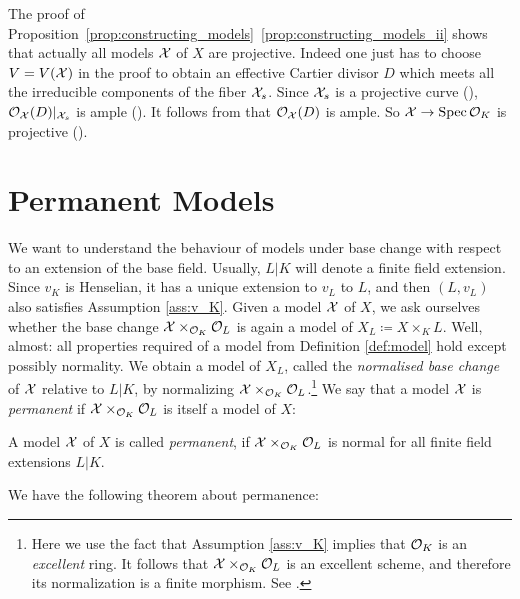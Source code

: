 \begin{remark}
    The proof of Proposition~\ref{prop:constructing_models}~\ref{prop:constructing_models_ii} shows that actually all models
    $\mathcal X$ of $X$ are projective.
    Indeed one just has to choose $V = V(\mathcal X)$ in the proof to obtain an effective Cartier divisor $D$ which meets
    all the irreducible components of the fiber $\mathcal X_s$.
    Since $\mathcal X_s$ is a projective curve (\cite[Exercise 7.5.4]{Liu}), $\mathcal{O}_\mathcal X(D)|_{\mathcal X_s}$ is ample (\cite[Proposition 7.5.5]{Liu}).
    It follows from \cite[Corollary 5.3.24]{Liu} that $\mathcal{O}_\mathcal X(D)$ is ample.
    So $\mathcal X \to \operatorname{Spec} \mathcal{O}_K$ is projective (\cite[Proposition 5.3.6]{Liu}).
\end{remark}


\section{Permanent Models}\label{sec:permament-models}

We want to understand the behaviour of models under base change with respect to an extension of the base field.
Usually, $L|K$ will denote a finite field extension.
Since $v_K$ is Henselian, it has a unique extension to $v_L$ to $L$, and then $(L,v_L)$ also satisfies Assumption \ref{ass:v_K}.
Given a model $\mathcal X$ of $X$, we ask ourselves whether the base change $\mathcal X\times_{\mathcal{O}_K}\mathcal{O}_L$ is again a model of $X_L \coloneqq X\times_K L$.
Well, almost: all properties required of a model from Definition \ref{def:model} hold except possibly normality.
We obtain a model of $X_L$, called the {\em normalised base change} of $\mathcal X$ relative to $L|K$, by normalizing $\mathcal X\times_{\mathcal{O}_K}\mathcal{O}_L$.\footnote{
    Here we use the fact that Assumption \ref{ass:v_K} implies that $\mathcal{O}_K$ is an \emph{excellent} ring.
    It follows that $\mathcal X\times_{\mathcal{O}_K}\mathcal{O}_L$ is an excellent scheme, and therefore its normalization is a finite morphism.
    See \cite[Chapter 8, in particular Theorem 8.2.39 (d)]{Liu}.
}
We say that a model $\mathcal X$ is \textit{permanent} if $\mathcal X \times_{\mathcal O_K}\mathcal O_L$ is itself a model of $X$:

\begin{definition} \label{def:permanent-model}
    A model $\mathcal X$ of $X$ is called \textit{permanent}, if $\mathcal X \times_{\mathcal O_K} \mathcal O_L$ is normal for all finite field extensions $L|K$.
\end{definition}

We have the following theorem about permanence:

